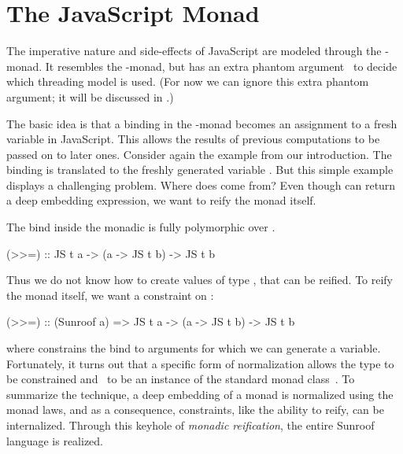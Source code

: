  
\section{The JavaScript Monad}
\label{sec:js-monad}

The imperative nature and side-effects of JavaScript are 
modeled through the \JS-monad. It resembles the \IO-monad, 
but has an extra phantom argument~\cite{Leijen:99:Phantom} 
to decide which threading model is used. 
(For now we can ignore this extra phantom argument; it will be
discussed in .)

The basic idea is that a binding in the \JS-monad becomes an
assignment to a fresh variable in JavaScript. 
This allows the results of previous computations to be passed on to 
later ones.
Consider again the example from our introduction.
The binding  is translated to the freshly generated
variable .
But this simple example displays a challenging problem. Where does
 come from? Even though  can return a deep embedding 
expression, we want to reify the monad itself.

The bind inside the monadic  is
fully polymorphic over .
\begin{Code}
(>>=) :: JS t a -> (a -> JS t b) -> JS t b
\end{Code}
Thus we do not know how to create values of type ,
that can be reified.
To reify the monad itself, we want a constraint on :
\begin{Code}
(>>=) :: (Sunroof a) => JS t a -> (a -> JS t b) -> JS t b
\end{Code}
where  constrains the bind to
arguments for which we can generate a variable.
Fortunately, it turns out that a specific form of normalization allows 
the type  to be constrained and \JS~to 
be an instance of the standard monad class~\cite{Sculthorpe:13:ConstrainedMonads}.
To summarize the technique, a deep embedding of a monad is normalized using the monad laws,
and as a consequence, constraints, like the ability to reify, can be internalized.
Through this keyhole of {\em monadic reification},
the entire Sunroof language is realized.

